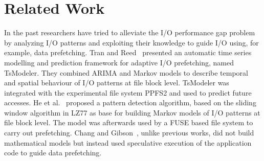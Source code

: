 \section{Related Work}
\label{sec: related_work}

In the past researchers have tried to alleviate the I/O performance gap problem by analyzing I/O patterns and exploiting their knowledge to guide I/O using, for example, data prefetching. Tran and Reed~\cite{TranR04} presented an automatic time series modelling and prediction framework for adaptive I/O prefetching, named TsModeler. They combined ARIMA and Markov models to describe temporal and spatial behaviour of I/O patterns at file block level. TsModeler was integrated with the experimental file system PPFS2 and used to predict future accesses. %
He et al.~\cite{HEBTAGGMCS13} proposed a pattern detection algorithm, based on the sliding window algorithm in LZ77 as base for building Markov models of I/O patterns at file block level. The model was afterwards used by a FUSE based file system to carry out prefetching. Chang and Gibson~\cite{ChangG99}, unlike previous works, did not build mathematical models but instead used speculative execution of the application code to guide data prefetching.  

